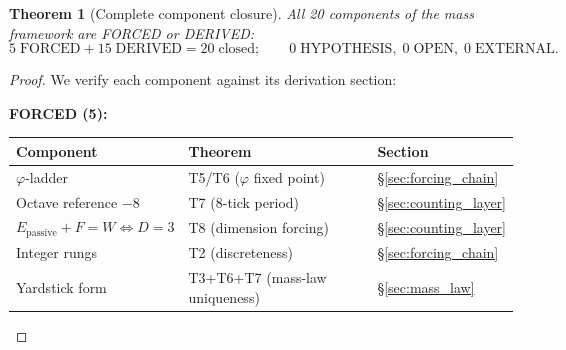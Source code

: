 \documentclass[11pt,a4paper]{article}
\newtheorem{theorem}{Theorem}[section]
\theoremstyle{definition}
\theoremstyle{remark}
\newcommand{\phig}{\varphi}
\newcommand{\Epass}{E_{\mathrm{passive}}}
\begin{document}
\begin{theorem}[Complete component closure]
\label{thm:20_of_20}
All 20 components of the mass framework are FORCED or DERIVED:
\begin{equation}
  \boxed{5\;\text{FORCED} + 15\;\text{DERIVED}
  = 20\;\text{closed};\qquad
  0\;\text{HYPOTHESIS},\;
  0\;\text{OPEN},\;
  0\;\text{EXTERNAL}.}
  \label{eq:20_of_20}
\end{equation}
\end{theorem}

\begin{proof}
We verify each component against its derivation section:

\medskip
\noindent\textbf{FORCED (5):}
\begin{center}
\small
\begin{tabular}{lll}
\toprule
Component & Theorem & Section \\
\midrule
$\phig$-ladder & T5/T6 ($\phig$ fixed point) & \S\ref{sec:forcing_chain} \\
Octave reference $-8$ & T7 (8-tick period) & \S\ref{sec:counting_layer} \\
$\Epass + F = W \iff D = 3$ & T8 (dimension forcing) & \S\ref{sec:counting_layer} \\
Integer rungs & T2 (discreteness) & \S\ref{sec:forcing_chain} \\
Yardstick form & T3+T6+T7 (mass-law uniqueness) & \S\ref{sec:mass_law} \\
\bottomrule
\end{tabular}
\end{center}


\end{proof}
\end{document}
